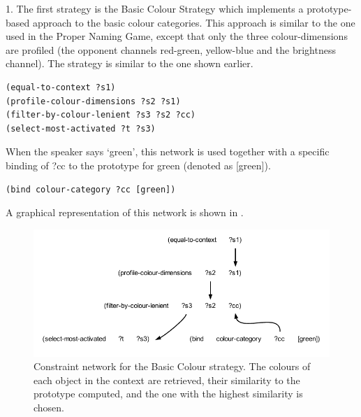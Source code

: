 \enlargethispage{1\baselineskip}
1. The first strategy is the {\bfshape Basic Colour Strategy} which implements a prototype-based approach to 
the basic colour categories. This approach is similar to the one used in the Proper Naming Game, except that 
only the three colour-dimensions are profiled (the opponent channels red-green, yellow-blue and the brightness channel). 
The strategy is similar to the one shown earlier. 
\begin{verbatim}
(equal-to-context ?s1) 
(profile-colour-dimensions ?s2 ?s1)
(filter-by-colour-lenient ?s3 ?s2 ?cc)
(select-most-activated ?t ?s3)
\end{verbatim}
When the speaker says `green', this network is used together with a specific binding of ?cc to the prototype for 
green (denoted as [green]). 
\begin{verbatim}
(bind colour-category ?cc [green])
\end{verbatim}
A graphical representation of this network is shown in . 

\begin{figure}[htbp]
  \centerline{\includegraphics[width=1.0\textwidth]{chap11/figs/basic-strat.pdf}}
\caption{\label{fig:basic-strat}Constraint network for the Basic Colour strategy. The colours of each object in the context are retrieved, their 
similarity to the prototype computed, and the one with the highest similarity is chosen.}
\end{figure}

